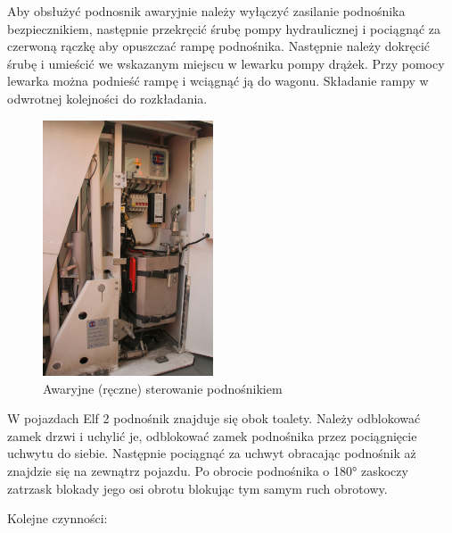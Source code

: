 Aby obsłużyć podnosnik awaryjnie należy wyłączyć zasilanie podnośnika bezpiecznikiem, następnie przekręcić śrubę pompy hydraulicznej i pociągnąć za czerwoną rączkę aby opuszczać rampę podnośnika. Następnie należy dokręcić śrubę i umieścić
we wskazanym miejscu w lewarku pompy drążek. Przy pomocy lewarka można podnieść rampę i wciągnąć ją do wagonu. Składanie rampy w odwrotnej kolejności do rozkładania.
	\begin{figure}
	\includegraphics[width=0.45\textwidth]{skryptkierownik-img/skryptkierownik-img041.jpg}
	\caption{Awaryjne (ręczne) sterowanie podnośnikiem}
\end{figure}

W pojazdach Elf 2 podnośnik znajduje się obok toalety. Należy odblokować zamek drzwi i uchylić je, odblokować zamek
podnośnika przez pociągnięcie uchwytu do siebie. Następnie pociągnąć za uchwyt obracając podnośnik aż znajdzie się na
zewnątrz pojazdu. Po obrocie podnośnika o 180° zaskoczy zatrzask blokady jego osi obrotu blokując tym samym ruch
obrotowy.

Kolejne czynności:

